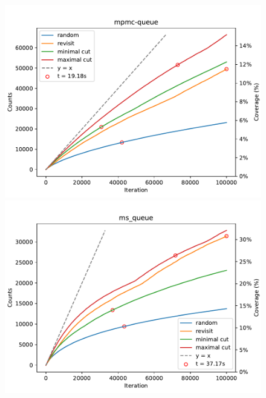 \begin{figure}[h!]
	\vspace{0.5cm}

	\begin{minipage}{0.45\textwidth}
		\centering
		\includegraphics[width=\textwidth]{figure/genmc/mpmc-queue.pdf}
	\end{minipage}
	\hfill
	\begin{minipage}{0.45\textwidth}
		\centering
		\includegraphics[width=\textwidth]{figure/genmc/ms_queue.pdf}
	\end{minipage}

	\vspace{0.5cm}


\end{figure}
